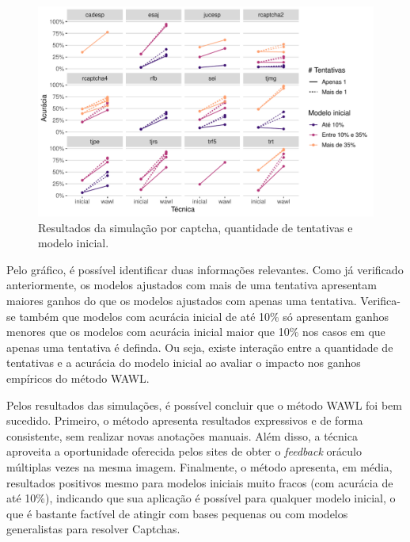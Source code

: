 \documentclass[12pt,twoside,brazilian]{book}
\begin{document}
\begin{figure}

{\centering \includegraphics[width=1\textwidth,height=\textheight]{./resultados_files/figure-pdf/fig-simulacao-captcha-1.pdf}

}

\caption{\label{fig-simulacao-captcha}Resultados da simulação por
captcha, quantidade de tentativas e modelo inicial.}

\end{figure}

Pelo gráfico, é possível identificar duas informações relevantes. Como
já verificado anteriormente, os modelos ajustados com mais de uma
tentativa apresentam maiores ganhos do que os modelos ajustados com
apenas uma tentativa. Verifica-se também que modelos com acurácia
inicial de até 10\% só apresentam ganhos menores que os modelos com
acurácia inicial maior que 10\% nos casos em que apenas uma tentativa é
definda. Ou seja, existe interação entre a quantidade de tentativas e a
acurácia do modelo inicial ao avaliar o impacto nos ganhos empíricos do
método WAWL.

Pelos resultados das simulações, é possível concluir que o método WAWL
foi bem sucedido. Primeiro, o método apresenta resultados expressivos e
de forma consistente, sem realizar novas anotações manuais. Além disso,
a técnica aproveita a oportunidade oferecida pelos sites de obter o
\emph{feedback} oráculo múltiplas vezes na mesma imagem. Finalmente, o
método apresenta, em média, resultados positivos mesmo para modelos
iniciais muito fracos (com acurácia de até 10\%), indicando que sua
aplicação é possível para qualquer modelo inicial, o que é bastante
factível de atingir com bases pequenas ou com modelos generalistas para
resolver Captchas.
\end{document}
